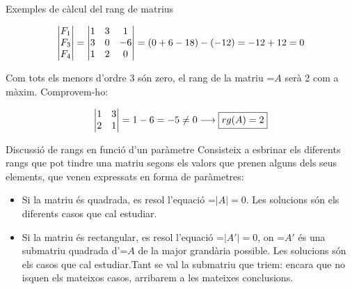 \documentclass[11pt,a4paper]{article}
\newcommand{\fmm}[1]{\setbox0=\hbox{$#1$}\ifdim\wd0>\linewidth\fmdisp{#1}\else\mbox{\box0}\fi}
\newcommand{\fmdisp}[1]{\[\setbox2=\hbox{$\displaystyle #1$}\ifdim\wd2>\linewidth\resizebox{\linewidth}{!}{\box2}\else\box2\fi\]}
\begin{document}
\begin{fmex}{Exemples de càlcul del rang de matrius}
\begin{enumerate}[label=\textbf{\arabic*.},leftmargin=*]
\fmdisp{\begin{vmatrix}F_1\\ F_3\\ F_4\end{vmatrix}=\begin{vmatrix}1 & 3 & 1\\ 3 & 0 & -6\\ 1 & 2 & 0\end{vmatrix}=(0+6-18)-(-12)=-12+12=0}

Com tots els menors d'ordre 3 són zero, el rang de la matriu \fmm{A} serà 2 com a màxim. Comprovem-ho:

\fmdisp{\begin{vmatrix}1 & 3\\ 2 & 1\end{vmatrix}=1-6=-5\neq0\longrightarrow\boxed{rg(A)=2}}

\end{enumerate}
\end{fmex}

\begin{fmprop}{Discussió de rangs en funció d'un paràmetre}
Consisteix a esbrinar els diferents rangs que pot tindre una matriu segons els valors que prenen alguns dels seus elements, que venen expressats en forma de paràmetres:

\begin{itemize}
\item Si la matriu és quadrada, es resol l'equació \fmm{|A|=0}. Les solucions són els diferents casos que cal estudiar.
\item Si la matriu és rectangular, es resol l'equació \fmm{|A'|=0}, on \fmm{A'} és una submatriu quadrada d'\fmm{A} de la major grandària possible. Les solucions són els casos que cal estudiar.\newline Tant se val la submatriu que triem: encara que no isquen els mateixos casos, arribarem a les mateixes conclusions.
\end{itemize}
\end{fmprop}
\end{document}
